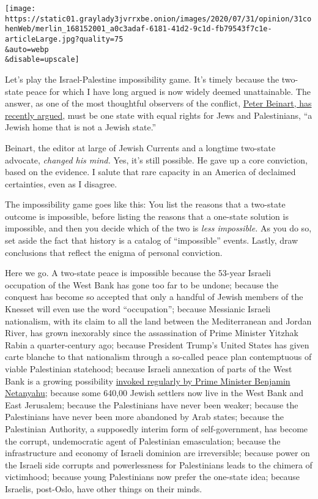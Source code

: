 \texttt{[image: https://static01.graylady3jvrrxbe.onion/images/2020/07/31/opinion/31cohenWeb/merlin\_168152001\_a0c3adaf-6181-41d2-9c1d-fb79543f7c1e-articleLarge.jpg?quality=75\\\&auto=webp\\\&disable=upscale]}

Let's play the Israel-Palestine impossibility game. It's timely because
the two-state peace for which I have long argued is now widely deemed
unattainable. The answer, as one of the most thoughtful observers of the
conflict,
\href{https://www.nytimes3xbfgragh.onion/2020/07/08/opinion/israel-annexation-two-state-solution.html}{Peter
Beinart, has recently argued}, must be one state with equal rights for
Jews and Palestinians, ``a Jewish home that is not a Jewish state.''

Beinart, the editor at large of Jewish Currents and a longtime two-state
advocate, \emph{changed his mind.} Yes, it's still possible. He gave up
a core conviction, based on the evidence. I salute that rare capacity in
an America of declaimed certainties, even as I disagree.

The impossibility game goes like this: You list the reasons that a
two-state outcome is impossible, before listing the reasons that a
one-state solution is impossible, and then you decide which of the two
is \emph{less impossible.} As you do so, set aside the fact that history
is a catalog of ``impossible'' events. Lastly, draw conclusions that
reflect the enigma of personal conviction.

Here we go. A two-state peace is impossible because the 53-year Israeli
occupation of the West Bank has gone too far to be undone; because the
conquest has become so accepted that only a handful of Jewish members of
the Knesset will even use the word ``occupation''; because Messianic
Israeli nationalism, with its claim to all the land between the
Mediterranean and Jordan River, has grown inexorably since the
assassination of Prime Minister Yitzhak Rabin a quarter-century ago;
because President Trump's United States has given carte blanche to that
nationalism through a so-called peace plan contemptuous of viable
Palestinian statehood; because Israeli annexation of parts of the West
Bank is a growing possibility
\href{https://www.nytimes3xbfgragh.onion/2020/01/28/world/middleeast/israel-west-bank-annex-sovereignty.html}{invoked
regularly by Prime Minister Benjamin Netanyahu}; because some 640,00
Jewish settlers now live in the West Bank and East Jerusalem; because
the Palestinians have never been weaker; because the Palestinians have
never been more abandoned by Arab states; because the Palestinian
Authority, a supposedly interim form of self-government, has become the
corrupt, undemocratic agent of Palestinian emasculation; because the
infrastructure and economy of Israeli dominion are irreversible; because
power on the Israeli side corrupts and powerlessness for Palestinians
leads to the chimera of victimhood; because young Palestinians now
prefer the one-state idea; because Israelis, post-Oslo, have other
things on their minds.

